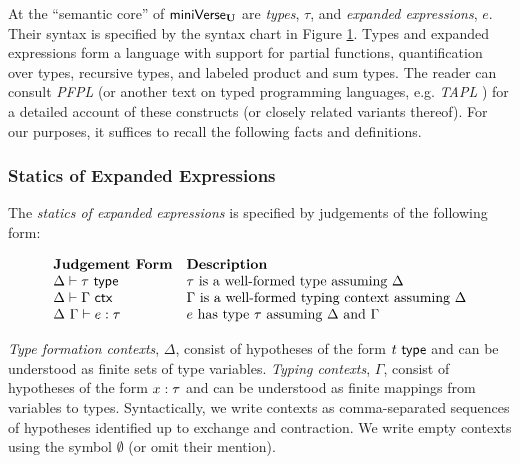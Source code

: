 \begin{figure}
\label{fig:U-expanded-terms}
\end{figure}

At the ``semantic core'' of $\mathsf{miniVerse}_\textbf{U}$ are \emph{types}, $\tau$, and \emph{expanded expressions}, $e$. Their syntax is specified by the syntax chart in Figure \ref{fig:U-expanded-terms}. 
Types and expanded expressions form a language with support for partial functions, quantification over types, recursive types, and labeled product and sum types. The reader can consult \emph{PFPL} \cite{pfpl} (or another text on typed programming languages, e.g. \emph{TAPL} \cite{tapl}) for a detailed account of these constructs (or closely related variants thereof). For our purposes, it suffices to recall the following facts and definitions.

\subsubsection{Statics of Expanded Expressions}
The \emph{statics of expanded expressions} is specified by judgements of the following form:

\[\begin{array}{ll}
\textbf{Judgement Form} & \textbf{Description}\\
\Delta \vdash \tau~\mathsf{type} & \text{$\tau$ is a well-formed type assuming $\Delta$}\\
\Delta \vdash \Gamma~\mathsf{ctx} & \text{$\Gamma$ is a well-formed typing context assuming $\Delta$}\\
\Delta~\Gamma \vdash e : \tau & \text{$e$ has type $\tau$ assuming $\Delta$ and $\Gamma$}
\end{array}\]

\emph{Type formation contexts}, $\Delta$, consist of hypotheses of the form $t~\mathsf{type}$ and can be understood as finite sets of type variables. \emph{Typing contexts}, $\Gamma$, consist of hypotheses of the form $x : \tau$ and can be understood as finite mappings from variables to types. Syntactically, we write contexts as comma-separated sequences of {hypotheses} identified up to exchange and contraction. We write empty contexts using the symbol $\emptyset$ (or omit their mention). 

